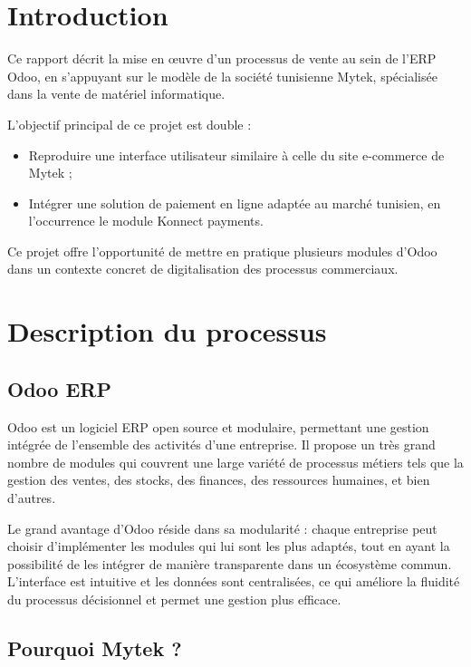 \documentclass[12pt]{report}
\begin{document}

\newpage

\tableofcontents
\newpage


\chapter{Introduction}

Ce rapport décrit la mise en œuvre d’un processus de vente au sein de l’ERP Odoo, en s’appuyant sur le modèle de la société tunisienne Mytek, spécialisée dans la vente de matériel informatique.

L’objectif principal de ce projet est double :
\begin{itemize}
    \item Reproduire une interface utilisateur similaire à celle du site e-commerce de Mytek ;
    \item Intégrer une solution de paiement en ligne adaptée au marché tunisien, en l’occurrence le module Konnect payments.
\end{itemize}

Ce projet offre l’opportunité de mettre en pratique plusieurs modules d’Odoo dans un contexte concret de digitalisation des processus commerciaux.

\chapter{Description du processus}

\section{Odoo ERP}

Odoo est un logiciel ERP open source et modulaire, permettant une gestion intégrée de l’ensemble des activités d'une entreprise. Il propose un très grand nombre de modules qui couvrent une large variété de processus métiers tels que la gestion des ventes, des stocks, des finances, des ressources humaines, et bien d'autres.

Le grand avantage d’Odoo réside dans sa modularité : chaque entreprise peut choisir d’implémenter les modules qui lui sont les plus adaptés, tout en ayant la possibilité de les intégrer de manière transparente dans un écosystème commun. L’interface est intuitive et les données sont centralisées, ce qui améliore la fluidité du processus décisionnel et permet une gestion plus efficace.

\section{Pourquoi Mytek ?}
\end{document}
